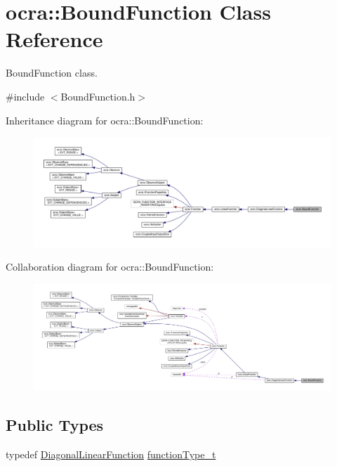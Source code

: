 \hypertarget{classocra_1_1BoundFunction}{}\section{ocra\+:\+:Bound\+Function Class Reference}
\label{classocra_1_1BoundFunction}


Bound\+Function class.  




{\ttfamily \#include $<$Bound\+Function.\+h$>$}



Inheritance diagram for ocra\+:\+:Bound\+Function\+:
\nopagebreak
\begin{figure}[H]
\begin{center}
\leavevmode
\includegraphics[width=350pt]{d3/ddd/classocra_1_1BoundFunction__inherit__graph}
\end{center}
\end{figure}


Collaboration diagram for ocra\+:\+:Bound\+Function\+:
\nopagebreak
\begin{figure}[H]
\begin{center}
\leavevmode
\includegraphics[width=350pt]{df/d41/classocra_1_1BoundFunction__coll__graph}
\end{center}
\end{figure}
\subsection*{Public Types}
\begin{DoxyCompactItemize}
\item 
typedef \hyperlink{classocra_1_1DiagonalLinearFunction}{Diagonal\+Linear\+Function} \hyperlink{classocra_1_1BoundFunction_acba2ac4d2f6caf04054590615a41ac21}{function\+Type\+\_\+t}
\end{DoxyCompactItemize}
